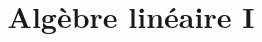 \documentclass[11pt]{book}
\begin{document}
\setcounter{section}{8}
\title{Algèbre linéaire I}
\maketitle
\thispagestyle{empty}
\listoflectures




\end{document}
